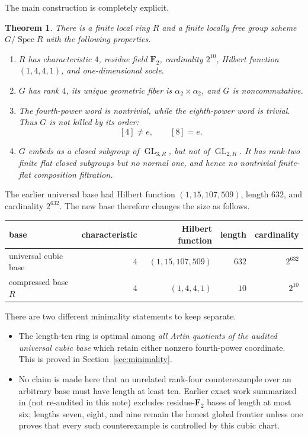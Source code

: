 \documentclass[11pt]{article}
\newtheorem{theorem}{Theorem}[section]
\theoremstyle{remark}
\newcommand{\F}{\mathbf F}
\newcommand{\Spec}{\operatorname{Spec}}
\newcommand{\GL}{\operatorname{GL}}
\begin{document}
The main construction is completely explicit.

\begin{theorem}\label{thm:main}
There is a finite local ring \(R\) and a finite locally free group scheme
\(G/\Spec R\) with the following properties.
\begin{enumerate}
\item \(R\) has characteristic \(4\), residue field \(\F_2\), cardinality
  \(2^{10}\), Hilbert function \((1,4,4,1)\), and one-dimensional socle.
\item \(G\) has rank \(4\), its unique geometric fiber is
  \(\alpha_2\times\alpha_2\), and \(G\) is noncommutative.
\item The fourth-power word is nontrivial, while the eighth-power word is
  trivial.  Thus \(G\) is not killed by its order:
  \[
    [4]\ne e,\qquad [8]=e.
  \]
\item \(G\) embeds as a closed subgroup of \(\GL_{3,R}\), but not of
  \(\GL_{2,R}\).  It has rank-two finite flat closed subgroups but no normal
  one, and hence no nontrivial finite-flat composition filtration.
\end{enumerate}
\end{theorem}

The earlier universal base had Hilbert function \((1,15,107,509)\), length
\(632\), and cardinality \(2^{632}\).  The new base therefore changes the
size as follows.
\begin{center}
\begin{tabular}{@{}lrrrr@{}}
\toprule
base & characteristic & Hilbert function & length & cardinality\\
\midrule
universal cubic base & \(4\) & \((1,15,107,509)\) & \(632\) & \(2^{632}\)\\
compressed base \(R\) & \(4\) & \((1,4,4,1)\) & \(10\) & \(2^{10}\)\\
\bottomrule
\end{tabular}
\end{center}

There are two different minimality statements to keep separate.
\begin{itemize}
\item The length-ten ring is optimal among \emph{all Artin quotients of the
audited universal cubic base} which retain either nonzero fourth-power
coordinate.  This is proved in Section~\ref{sec:minimality}.
\item No claim is made here that an unrelated rank-four counterexample over
an arbitrary base must have length at least ten.  Earlier exact work summarized
in  (not re-audited in
this note) excludes residue-\(\F_2\) bases of length at most six; lengths
seven, eight, and nine remain the honest global frontier unless one proves
that every such counterexample is controlled by this cubic chart.
\end{itemize}
\end{document}
